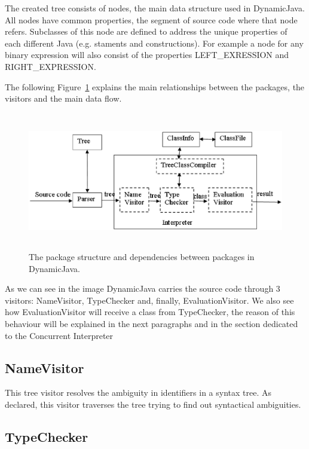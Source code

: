 The created tree consists of nodes, the main data structure used in DynamicJava. All nodes have common properties, the segment of source code where that node refers. Subclasses of this node are defined to address the unique properties of each different Java (e.g. staments and constructions). For example a node for any binary expression will also consist of the properties LEFT\_EXRESSION and RIGHT\_EXPRESSION.

The following Figure~\ref{fig:djava_structure} explains the main relationships between the packages, the visitors and the main data flow.

\begin{figure}[!htb]
\begin{center}
\includegraphics[height=6cm]{djava_structure.eps}
\caption{The package structure and dependencies between packages in DynamicJava.}
\label{fig:djava_structure}
\end{center}
\end{figure}

As we can see in the image DynamicJava carries the source code through 3 visitors: NameVisitor, TypeChecker and, finally, EvaluationVisitor. We also see how EvaluationVisitor will receive a class from TypeChecker, the reason of this behaviour will be explained in the next paragraphs and in the section dedicated to the Concurrent Interpreter

\subsection{NameVisitor}

This tree visitor resolves the ambiguity in identifiers in a syntax tree. As declared, this visitor traverses the tree trying to find out syntactical ambiguities.

\subsection{TypeChecker}

